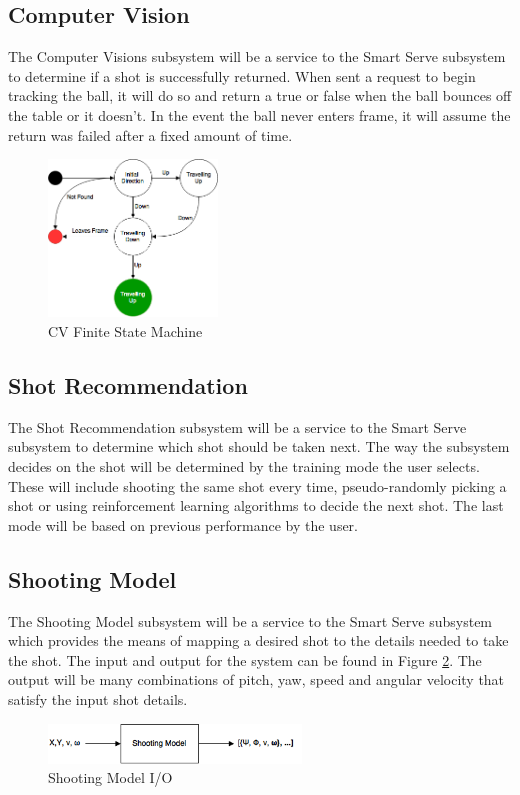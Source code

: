 \documentclass[11pt]{article}
\begin{document}
\subsection{Computer Vision}
The Computer Visions subsystem will be a service to the Smart Serve subsystem to determine if a shot is successfully returned. When sent a request to begin tracking the ball, it will do so and return a true or false when the ball bounces off the table or it doesn't. In the event the ball never enters frame, it will assume the return was failed after a fixed amount of time.
\begin{figure}[H]
   \centering
   \includegraphics[width=0.4\textwidth]{img/cvFSM.png}
   \caption{CV Finite State Machine}
   \label{fig:cv}
\end{figure}
\subsection{Shot Recommendation}
The Shot Recommendation subsystem will be a service to the Smart Serve subsystem to determine which shot should be taken next. The way the subsystem decides on the shot will be determined by the training mode the user selects. These will include shooting the same shot every time, pseudo-randomly picking a shot or using reinforcement learning algorithms to decide the next shot. The last mode will be based on previous performance by the user.

\subsection{Shooting Model}
The Shooting Model subsystem will be a service to the Smart Serve subsystem which provides the means of mapping a desired shot to the details needed to take the shot. The input and output for the system can be found in Figure \ref{fig:shotmodel}. The output will be many combinations of pitch, yaw, speed and angular velocity that satisfy the input shot details.
\begin{figure}[htbp]
   \centering
   \includegraphics[width=0.6\textwidth]{img/ShotModel.png} %
   \caption{Shooting Model I/O}
   \label{fig:shotmodel}
\end{figure}
\end{document}
